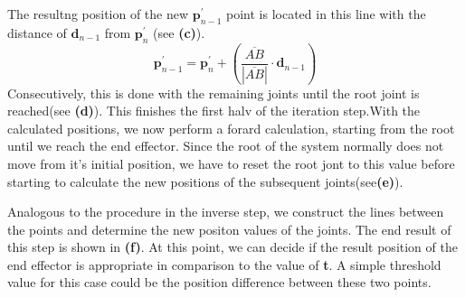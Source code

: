 The resultng position of the new $\textbf{p}_{n-1}^{'}$ point is located in this line with the distance of $\textbf{d}_{n-1}$ from $\textbf{p}_{n}^{'}$ (see \textbf{(c)}).
\begin{equation}
\textbf{p}_{n-1}^{'}= \textbf{p}_{n}^{'}+ \left(\frac{\overline{AB}}{|\overline{AB}|}\cdot\textbf{d}_{n-1}\right)
\end{equation}
Consecutively, this is done with the remaining joints until the root joint is reached(see \textbf{(d)}).
This finishes the first halv of the iteration step.With the calculated positions, we now perform a forard calculation, starting from the root until we reach the end effector. Since the root of the system normally does not move from it's initial position, we have to reset the root jont to this value before starting to calculate the new positions of the subsequent joints(see\textbf{(e)}).

Analogous to the procedure in the inverse step, we construct the lines between the points and determine the new positon values of the joints. The end result of this step is shown in \textbf{(f)}. At this point, we can decide if the result position of the end effector is appropriate in comparison to the value of \textbf{t}. A simple threshold value for this case could be the position difference between these two points.
